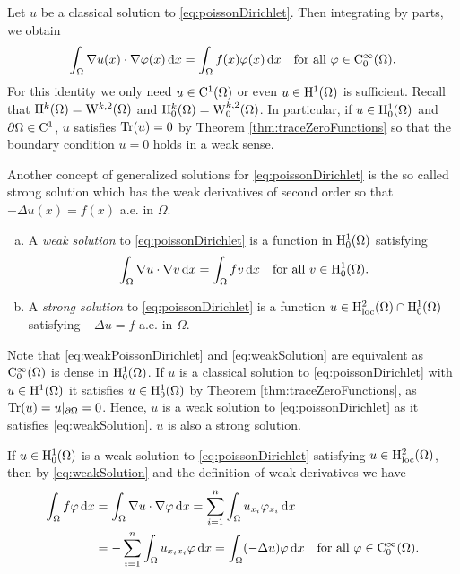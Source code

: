 Let $u$ be a classical solution to \eqref{eq:poissonDirichlet}.
Then integrating by parts, we obtain
\begin{equation}
  \label{eq:weakPoissonDirichlet}
  \int_\Omega \nabla u(x) \cdot \nabla \varphi(x) \, {\operatorname{d}\!{x}} = \int_\Omega f(x) \varphi(x) \, {\operatorname{d}\!{x}} \quad\text{for all } \varphi \in \mathrm{C}_0^\infty(\Omega).
\end{equation}
For this identity we only need $u \in \mathrm{C}^1(\Omega)$ or even $u \in \mathrm{H}^1(\Omega)$ is sufficient.
Recall that $\mathrm{H}^k(\Omega) = \mathrm{W}^{k,2}(\Omega)$ and $\mathrm{H}_0^k(\Omega) = \mathrm{W}_0^{k,2}(\Omega)$.
In particular, if $u \in \mathrm{H}_0^1(\Omega)$ and $\partial\Omega \in \mathrm{C}^1$, $u$ satisfies $\operatorname{Tr}(u) = 0$ by Theorem \ref{thm:traceZeroFunctions} so that the boundary condition $u = 0$ holds in a weak sense.

Another concept of generalized solutions for \eqref{eq:poissonDirichlet} is the so called strong solution which has the weak derivatives of second order so that $-\Delta u(x) = f(x)$ a.e. in $\Omega$.

\begin{defn}
  \begin{enumerate}[a)]
    \item A \emph{weak solution} to \eqref{eq:poissonDirichlet} is  a function in $\mathrm{H}_0^1(\Omega)$ satisfying 
      \begin{equation}
        \label{eq:weakSolution}
        \int_\Omega \nabla u \cdot \nabla v \, {\operatorname{d}\!{x}} = \int_\Omega f v \, {\operatorname{d}\!{x}} \quad\text{for all } v \in \mathrm{H}_0^1(\Omega).
      \end{equation}
    \item A \emph{strong solution} to \eqref{eq:poissonDirichlet} is a function $u \in \mathrm{H}_{\operatorname{loc}}^2(\Omega) \cap \mathrm{H}_0^1(\Omega)$ satisfying $-\Delta u = f$ a.e. in $\Omega$.
  \end{enumerate}
\end{defn}

Note that \eqref{eq:weakPoissonDirichlet} and \eqref{eq:weakSolution} are equivalent as $\mathrm{C}_0^\infty(\Omega)$ is dense in $\mathrm{H}_0^1(\Omega)$.
If $u$ is a classical solution to \eqref{eq:poissonDirichlet} with $u \in \mathrm{H}^1(\Omega)$ it satisfies $u \in \mathrm{H}_0^1(\Omega)$ by Theorem \ref{thm:traceZeroFunctions}, as $\operatorname{Tr}(u) = u|_{\partial\Omega} = 0$. 
Hence, $u$ is a weak solution to \eqref{eq:poissonDirichlet} as it satisfies \eqref{eq:weakSolution}.
$u$ is also a strong solution.

If $u \in \mathrm{H}_0^1(\Omega)$ is a weak solution to \eqref{eq:poissonDirichlet} satisfying $u \in \mathrm{H}_{\operatorname{loc}}^2(\Omega)$, then by \eqref{eq:weakSolution} and the definition of weak derivatives we have
\begin{align*}
\int_\Omega f \varphi \, {\operatorname{d}\!{x}}
&= \int_\Omega \nabla u \cdot \nabla \varphi \, {\operatorname{d}\!{x}}
= \sum_{i = 1}^n \int_\Omega u_{x_i} \varphi_{x_i} \, {\operatorname{d}\!{x}} \\
&= -\sum_{i = 1}^n \int_\Omega u_{x_i x_i} \varphi\, {\operatorname{d}\!{x}} 
= \int_\Omega (-\Delta u) \varphi \, {\operatorname{d}\!{x}} \quad \text{for all } \varphi \in \mathrm{C}_0^\infty(\Omega).
\end{align*}

